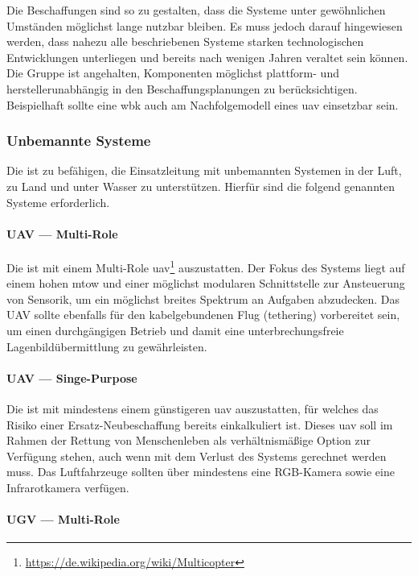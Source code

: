 \noindent Die Beschaffungen sind so zu gestalten, dass die Systeme unter gewöhnlichen Umständen möglichst lange nutzbar bleiben. Es muss jedoch darauf hingewiesen werden, dass nahezu alle beschriebenen Systeme starken technologischen Entwicklungen unterliegen und bereits nach wenigen Jahren veraltet sein können. Die Gruppe ist angehalten, Komponenten möglichst plattform- und herstellerunabhängig in den Beschaffungsplanungen zu berücksichtigen. Beispielhaft sollte eine \ac{wbk} auch am Nachfolgemodell eines \ac{uav} einsetzbar sein.

\subsubsection{Unbemannte Systeme}

Die \callee{} ist zu befähigen, die Einsatzleitung mit unbemannten Systemen in der Luft, zu Land und unter Wasser zu unterstützen. Hierfür sind die folgend genannten Systeme erforderlich.

\paragraph{UAV — Multi-Role}

Die \callee{} ist mit einem Multi-Role \ac{uav}\footnote{\url{https://de.wikipedia.org/wiki/Multicopter}} auszustatten. Der Fokus des Systems liegt auf einem hohen \ac{mtow} und einer möglichst modularen Schnittstelle zur Ansteuerung von Sensorik, um ein möglichst breites Spektrum an Aufgaben abzudecken. Das UAV sollte ebenfalls für den kabelgebundenen Flug (tethering) vorbereitet sein, um einen durchgängigen Betrieb und damit eine unterbrechungsfreie Lagenbildübermittlung zu gewährleisten.

\paragraph{UAV — Singe-Purpose}

Die \callee{} ist mit mindestens einem günstigeren \ac{uav} auszustatten, für welches das Risiko einer Ersatz-Neubeschaffung bereits einkalkuliert ist. Dieses \ac{uav} soll im Rahmen der Rettung von Menschenleben als verhältnismäßige Option zur Verfügung stehen, auch wenn mit dem Verlust des Systems gerechnet werden muss. Das Luftfahrzeuge sollten über mindestens eine RGB-Kamera sowie eine Infrarotkamera verfügen.

\paragraph{UGV — Multi-Role}

